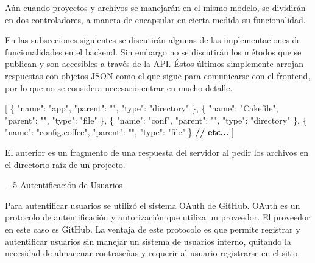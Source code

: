 \documentclass[12pt,titlepage,]{article}
\makeatletter
\newenvironment{Shaded}{}{}
\newcommand{\DataTypeTok}[1]{\textcolor[rgb]{0.56,0.13,0.00}{{#1}}}
\newcommand{\StringTok}[1]{\textcolor[rgb]{0.25,0.44,0.63}{{#1}}}
\newcommand{\ErrorTok}[1]{\textcolor[rgb]{1.00,0.00,0.00}{\textbf{{#1}}}}
\newcommand{\NormalTok}[1]{{#1}}
\renewcommand\paragraph{%
   \@startsection{paragraph}{4}{0mm}%
      {-\baselineskip}%
      {.5\baselineskip}%
      {\normalfont\normalsize\bfseries}}
\makeatother
\begin{document}
Aún cuando proyectos y archivos se manejarán en el mismo modelo, se
dividirán en dos controladores, a manera de encapsular en cierta medida
su funcionalidad.

En las subsecciones siguientes se discutirán algunas de las
implementaciones de funcionalidades en el backend. Sin embargo no se
discutirán los métodos que se publican y son accesibles a través de la
API. Éstos últimos simplemente arrojan respuestas con objetos JSON como
el que sigue para comunicarse con el frontend, por lo que no se
considera necesario entrar en mucho detalle.

\begin{Shaded}
\begin{Highlighting}[]
\NormalTok{[}
    \NormalTok{\{}
        \DataTypeTok{"name"}\NormalTok{: }\StringTok{"app"}\NormalTok{,}
        \DataTypeTok{"parent"}\NormalTok{: }\StringTok{""}\NormalTok{,}
        \DataTypeTok{"type"}\NormalTok{: }\StringTok{"directory"}
    \NormalTok{\},}
    \NormalTok{\{}
        \DataTypeTok{"name"}\NormalTok{: }\StringTok{"Cakefile"}\NormalTok{,}
        \DataTypeTok{"parent"}\NormalTok{: }\StringTok{""}\NormalTok{,}
        \DataTypeTok{"type"}\NormalTok{: }\StringTok{"file"}
    \NormalTok{\},}
    \NormalTok{\{}
        \DataTypeTok{"name"}\NormalTok{: }\StringTok{"conf"}\NormalTok{,}
        \DataTypeTok{"parent"}\NormalTok{: }\StringTok{""}\NormalTok{,}
        \DataTypeTok{"type"}\NormalTok{: }\StringTok{"directory"}
    \NormalTok{\},}
    \NormalTok{\{}
        \DataTypeTok{"name"}\NormalTok{: }\StringTok{"config.coffee"}\NormalTok{,}
        \DataTypeTok{"parent"}\NormalTok{: }\StringTok{""}\NormalTok{,}
        \DataTypeTok{"type"}\NormalTok{: }\StringTok{"file"}
    \NormalTok{\}}
    \ErrorTok{//} \ErrorTok{etc...}
\NormalTok{]}
\end{Highlighting}
\end{Shaded}

El anterior es un fragmento de una respuesta del servidor al pedir los
archivos en el directorio raíz de un projecto.

\paragraph{Autentificación de Usuarios}

Para autentificar usuarios se utilizó el sistema OAuth de GitHub. OAuth
es un protocolo de autentificación y autorización que utiliza un
proveedor. El proveedor en este caso es GitHub. La ventaja de este
protocolo es que permite registrar y autentificar usuarios sin manejar
un sistema de usuarios interno, quitando la necesidad de almacenar
contraseñas y requerir al usuario registrarse en el sitio.
\end{document}
